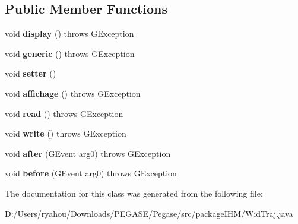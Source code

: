 \subsection*{Public Member Functions}
\begin{DoxyCompactItemize}
\item 
\mbox{\label{classpackage_i_h_m_1_1_wid_traj_a021b6d66d6963284a775bf8cbaf15939}} 
void {\bfseries display} ()  throws G\+Exception 
\item 
\mbox{\label{classpackage_i_h_m_1_1_wid_traj_ac2e6f72b5156233385b2ae89b17567cc}} 
void {\bfseries generic} ()  throws G\+Exception 
\item 
\mbox{\label{classpackage_i_h_m_1_1_wid_traj_aefe96f165ee1028fa8a9d05002765394}} 
void {\bfseries setter} ()
\item 
\mbox{\label{classpackage_i_h_m_1_1_wid_traj_a45b2c56d289f5fde0de9969f0ce56a55}} 
void {\bfseries affichage} ()  throws G\+Exception 
\item 
\mbox{\label{classpackage_i_h_m_1_1_wid_traj_a965d195e28404247236e177b1addd4ce}} 
void {\bfseries read} ()  throws G\+Exception 
\item 
\mbox{\label{classpackage_i_h_m_1_1_wid_traj_a83e022694bab14a4d74e9a2e1ac65ffe}} 
void {\bfseries write} ()  throws G\+Exception 
\item 
\mbox{\label{classpackage_i_h_m_1_1_wid_traj_a11028e82e3c45a58ab91b4b4c1095d7a}} 
void {\bfseries after} (G\+Event arg0)  throws G\+Exception 
\item 
\mbox{\label{classpackage_i_h_m_1_1_wid_traj_a539f2bb57712f663ef17082633bf61e8}} 
void {\bfseries before} (G\+Event arg0)  throws G\+Exception 
\end{DoxyCompactItemize}


The documentation for this class was generated from the following file\+:\begin{DoxyCompactItemize}
\item 
D\+:/\+Users/ryahou/\+Downloads/\+P\+E\+G\+A\+S\+E/\+Pegase/src/package\+I\+H\+M/Wid\+Traj.\+java\end{DoxyCompactItemize}
